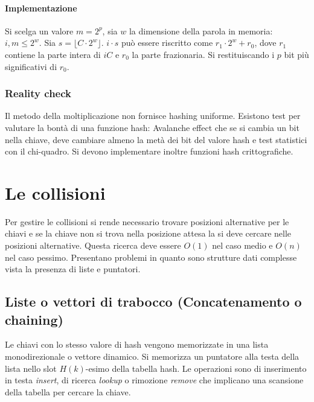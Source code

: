 \paragraph{Implementazione}
Si scelga un valore $m=2^p$, sia $w$ la dimensione della parola in memoria: $i, m\le 2^w$. Sia $s=\lfloor C\cdot 2^w\rfloor$. $i\cdot s$ pu\`o essere
riscritto come $r_1\cdot 2^w+r_0$, dove $r_1$ contiene la parte intera di $iC$ e $r_0$ la parte frazionaria. Si restituiscando i $p$ bit pi\`u significativi
di $r_0$.
\subsubsection{Reality check}
Il metodo della moltiplicazione non fornisce hashing uniforme. Esistono test per valutare la bont\`a di una funzione hash: Avalanche effect che se si cambia
un bit nella chiave, deve cambiare almeno la met\`a dei bit del valore hash e test statistici con il chi-quadro. Si devono implementare inoltre funzioni
hash crittografiche.
\section{Le collisioni}
Per gestire le collisioni si rende necessario trovare posizioni alternative per le chiavi e se la chiave non si trova nella posizione attesa la si deve
cercare nelle posizioni alternative. Questa ricerca deve essere $O(1)$ nel caso medio e $O(n)$ nel caso pessimo. Presentano problemi in quanto sono
strutture dati complesse vista la presenza di liste e puntatori.
\subsection{Liste o vettori di trabocco (Concatenamento o chaining)}
Le chiavi con lo stesso valore di hash vengono memorizzate in una lista monodirezionale o vettore dinamico. Si memorizza un puntatore alla testa della lista
nello slot $H(k)$-esimo della tabella hash. Le operazioni sono di inserimento in testa \emph{insert}, di ricerca \emph{lookup} o rimozione \emph{remove} che
implicano una scansione della tabella per cercare la chiave.
